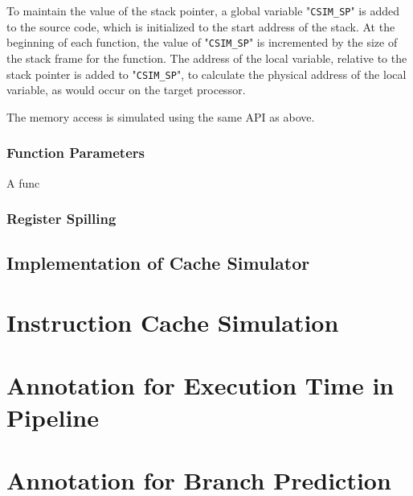 To maintain the value of the stack pointer, a global variable "\texttt{CSIM\_SP}" is added to the source code, which is initialized to the start address of the stack. At the beginning of each function, the value of "\texttt{CSIM\_SP}" is incremented by the size of the stack frame for the function. The address of the local variable, relative to the stack pointer is added to "\texttt{CSIM\_SP}", to calculate the physical address of the local variable, as would occur on the target processor.

The memory access is simulated using the same API as above.

\subsubsection{Function Parameters}
A func

\subsubsection{Register Spilling}

\subsection{Implementation of Cache Simulator}

\section{Instruction Cache Simulation}

\section{Annotation for Execution Time in Pipeline}

\section{Annotation for Branch Prediction}








